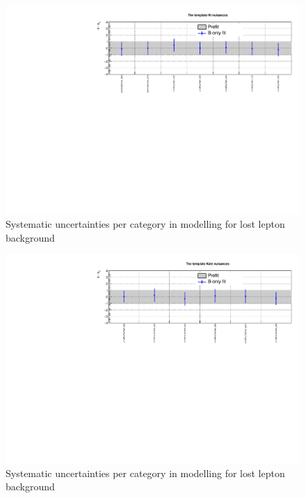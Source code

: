 \clearpage
\begin{figure}[h!]
  \centering
  \caption{Systematic uncertainties per \scalht category in \mht modelling for lost lepton background}
  \includegraphics[width=1.\linewidth]{figures/results/36invfb_preapproval/postfit/nuis/TemplateTtw_ht_nuisances}
\end{figure}

\begin{figure}[h!]
  \centering
  \caption{Systematic uncertainties per \njet category in \mht modelling for lost lepton background}
  \includegraphics[width=1.\linewidth]{figures/results/36invfb_preapproval/postfit/nuis/TemplateTtw_njet_nuisances}
\end{figure}

